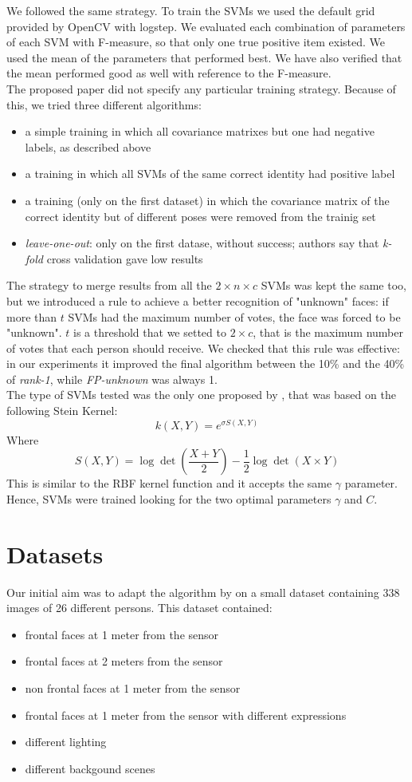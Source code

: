 \documentclass{article}
\begin{document}
We followed the same strategy. To train the SVMs we used the default grid
provided by OpenCV with logstep. We evaluated each combination of parameters of
each SVM with F-measure, so that only one true positive item existed. We used
the mean of the parameters that performed best. We have also verified that the
mean performed good as well with reference to the F-measure.
\\
The proposed paper did not specify any particular training strategy. Because of
this, we tried three different algorithms:
\begin{itemize}
	\item a simple training in which all covariance matrixes but one had
		negative labels, as described above
	\item a training in which all SVMs of the same correct identity had
		positive label
	\item a training (only on the first dataset) in which the covariance
		matrix of the correct identity but of different poses were
		removed from the trainig set
	\item \textit{leave-one-out}: only on the first datase, without
		success; authors say that \textit{k-fold} cross
		validation gave low results
\end{itemize}
The strategy to merge results from all the $2 \times n \times c$ SVMs was kept
the same too, but we introduced a rule to achieve a better recognition of
"unknown" faces: if more than $t$ SVMs had the maximum number of votes, the
face was forced to be "unknown". $t$ is a threshold that we setted to $2 \times
c$, that is the maximum number of votes that each person should receive. We
checked that this rule was effective: in our experiments it improved the final
algorithm between the 10\% and the 40\% of \textit{rank-1}, while
\textit{FP-unknown} was always 1.
\\
The type of SVMs tested was the only one proposed by \citep{Hayat2016}, that
was based on the following Stein Kernel:
$$
k(X, Y) = e^{\sigma S(X,Y)}
$$
Where
$$
S(X, Y) = \log\det\left(\frac{X + Y}{2}\right)-\frac{1}{2} \log \det(X\times Y)
$$
This is similar to the RBF kernel function and it accepts the same $\gamma$
parameter. Hence, SVMs were trained looking for the two optimal parameters
$\gamma$ and $C$.

\section{Datasets}
Our initial aim was to adapt the algorithm by \citep{Hayat2016} on a small dataset
containing 338 images of 26 different persons. This dataset contained:
\begin{itemize}
	\item frontal faces at 1 meter from the sensor
	\item frontal faces at 2 meters from the sensor
	\item non frontal faces at 1 meter from the sensor
	\item frontal faces at 1 meter from the sensor with different expressions
	\item different lighting
	\item different backgound scenes
\end{itemize}
\end{document}
